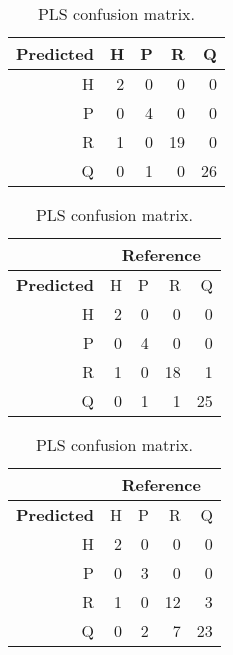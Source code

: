 \documentclass{article}
\begin{document}
\begin{CJK}{UTF8}{gbsn}
\begin{table}
{{\begin{minipage}[b]{0.5\hsize}
\begin{tabular}{r|rrrr}
				\midrule
				\textbf{Predicted}  & H & P & R & Q \\ 
				\midrule
				H &   2 &   0 &   0 &   0 \\ 
				P &   0 &   4 &   0 &   0 \\ 
				R &   1 &   0 &  19 &   0 \\ 
				Q &   0 &   1 &   0 &  26 \\
				\bottomrule 
				\end{tabular}
				\caption{PLS-LDA confusion matrix.}
				\label{tab:cmplslda}
				\vskip 1cm
				\begin{tabular}{r|rrrr}
				\toprule
				& \multicolumn{4}{c}{\textbf{Reference}} \\
				\midrule
				\textbf{Predicted}  & H & P & R & Q \\ 
				\midrule
				H &   2 &   0 &   0 &   0 \\ 
				P &   0 &   4 &   0 &   0 \\ 
				R &   1 &   0 &  18 &   1 \\ 
				Q &   0 &   1 &   1 &  25 \\
				\bottomrule 
				\end{tabular}
				\caption{LDA confusion matrix.}
				\label{tab:cmlda}
				\vskip 1cm
				\begin{tabular}{r|rrrr}
				\toprule
				& \multicolumn{4}{c}{\textbf{Reference}} \\
				\midrule
				\textbf{Predicted}  & H & P & R & Q \\ 
				\midrule
				H &   2 &   0 &   0 &   0 \\ 
				P &   0 &   3 &   0 &   0 \\ 
				R &   1 &   0 &  12 &   3 \\ 
				Q &   0 &   2 &   7 &  23 \\ 
				\bottomrule 
				\end{tabular}
				\caption{PLS confusion matrix.}
				\label{tab:cmpls}
				\end{minipage}
				\hfil
			}}
			\end{table}

		
	\end{CJK}
\end{document}

